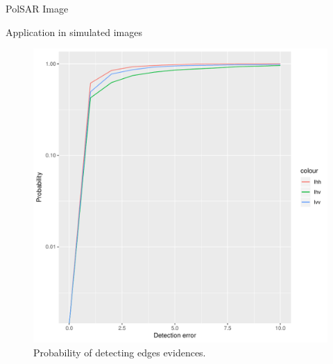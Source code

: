 \documentclass[10pt]{beamer}
\begin{document}
\begin{frame}[fragile]{PolSAR Image}
\begin{alertblock}{Application in simulated images} 
	\begin{figure}[hbt]
	\centering
	\includegraphics[width=.5\linewidth]{metricas_ihh_ivh_ivv_nhfc_artigos}%
	\caption{Probability of detecting edges evidences.}
\label{fig4}
\end{figure}
\end{alertblock}
\end{frame}
\end{document}
